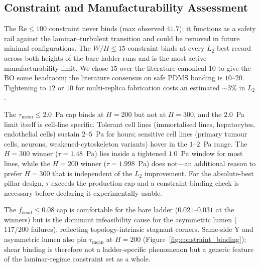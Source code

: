 \documentclass[12pt]{article}
\begin{document}
\subsection{Constraint and Manufacturability Assessment}
\label{sec:constraint_assessment}
The $\text{Re} \leq 100$ constraint never binds (max observed $41.7$); it functions as a safety rail against the laminar--turbulent transition and could be removed in future minimal configurations. The $W/H \leq 15$ constraint binds at every $L_2$-best record across both heights of the bare-ladder runs and is the most active manufacturability limit. We chose $15$ over the literature-canonical $10$ to give the BO some headroom; the literature consensus on safe PDMS bonding is $10$--$20$. Tightening to $12$ or $10$ for multi-replica fabrication costs an estimated $\sim 3\%$ in $L_2$.

The $\tau_{\text{mean}} \leq 2.0$~Pa cap binds at $H = 200$ but not at $H = 300$, and the $2.0$~Pa limit itself is cell-line specific. Tolerant cell lines (immortalised lines, hepatocytes, endothelial cells) sustain $2$--$5$~Pa for hours; sensitive cell lines (primary tumour cells, neurons, weakened-cytoskeleton variants) hover in the $1$--$2$~Pa range. The $H = 300$ winner ($\tau = 1.48$~Pa) lies inside a tightened $1.0$~Pa window for most lines, while the $H = 200$ winner ($\tau = 1.998$~Pa) does not---an additional reason to prefer $H = 300$ that is independent of the $L_2$ improvement. For the absolute-best pillar design, $\tau$ exceeds the production cap and a constraint-binding check is necessary before declaring it experimentally usable.

The $f_{\text{dead}} \leq 0.08$ cap is comfortable for the bare ladder ($0.021$--$0.031$ at the winners) but is the dominant infeasibility cause for the asymmetric lumen ($117/200$ failures), reflecting topology-intrinsic stagnant corners. Same-side Y and asymmetric lumen also pin $\tau_{\text{mean}}$ at $H = 200$ (Figure~\ref{fig:constraint_binding}); shear binding is therefore not a ladder-specific phenomenon but a generic feature of the laminar-regime constraint set as a whole.
\end{document}
